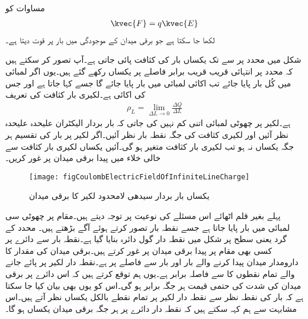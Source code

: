 مساوات  کو
\begin{align}
\kvec{F}=q \kvec{E}
\end{align}
لکھا جا سکتا ہے جو برقی میدان  کے موجودگی میں بار  پر قوت  دیتا ہے۔


شکل  میں  محدد پر  سے  تک یکساں بار کی کثافت پائی جاتی ہے۔آپ تصور کر سکتے ہیں کہ  محدد پر انتہائی قریب قریب برابر فاصلے پر یکساں  رکھے گئے ہیں۔یوں اگر  لمبائی میں کُل  بار پایا جائے تب اکائی لمبائی میں  بار پایا جائے گا جسے    کہا جاتا ہے اور جس کی اکائی  ہے۔لکیری بار کثافت کی تعریف
\begin{align}
\rho_L=\lim_{\Delta L \to 0}\frac{\Delta Q}{\Delta L}
\end{align}
ہے۔لکیر پر چھوٹی لمبائی  اتنی کم نہیں کی جاتی کہ بار بردار الیکٹران علیحدہ علیحدہ نظر آئیں اور لکیری کثافت کی جگہ نقطہ بار نظر آئیں۔اگر لکیر پر بار کی تقسیم ہر جگہ یکساں نہ ہو تب لکیری بار کثافت متغیر ہو گی۔آئیں یکساں لکیری بار کثافت سے خالی خلاء میں پیدا برقی میدان پر غور کریں۔ 
 \begin{figure}
\centering
\texttt{[image: figCoulombElectricFieldOfInfiniteLineCharge]}
\caption{یکساں بار بردار سیدھی لامحدود لکیر  کا برقی میدان}
\label{شکل_کولمب_لامحدود_لکیر_پر_بار_کا_میدان}
\end{figure}

پہلے بغیر قلم اٹھائے اس مسئلے کی نوعیت پر توجہ دیتے ہیں۔مقام  پر  چھوٹی سی لمبائی  میں  بار پایا جاتا ہے جسے نقطہ بار تصور کرتے ہوئے آگے بڑھتے ہیں۔ محدد کے گرد  یعنی   سطح پر  شکل  میں نقطہ دار گول دائرہ بنایا گیا ہے۔نقطہ بار  سے دائرے پر کسی بھی مقام پر پیدا برقی میدان پر غور کرتے ہیں۔برقی میدان کی مقدار کا دارومدار میدان پیدا کرنے والے بار اور بار سے فاصلے پر ہے۔نقطہ دار لکیر پر پائے جانے والے تمام نقطوں کا  سے فاصلہ برابر ہے۔یوں ہم توقع کرتے ہیں کہ اس دائرے پر برقی میدان کی شدت کی حتمی قیمت ہر جگہ برابر ہو گی۔اس کو یوں بھی بیان کیا جا سکتا ہے کہ بار کی نقطہ نظر سے نقطہ دار لکیر پر تمام نقطے بالکل یکساں نظر آتے ہیں۔اس مشابہت سے ہم کہہ سکتے ہیں کہ نقطہ دار دائرے پر ہر جگہ برقی میدان یکساں ہو گا۔ 

